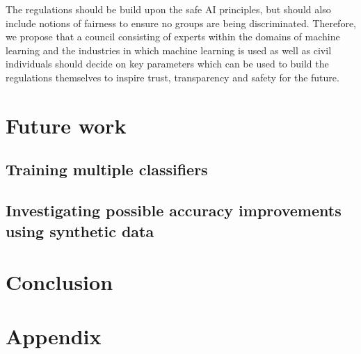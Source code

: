 \documentclass[12pt, fleqn, titlepage]{article}
\newcommand{\1}[1]{\mathds{1}\left[#1\right]}
\begin{document}
The regulations should be build upon the safe AI principles, but should also include notions of fairness to ensure no groups are being discriminated. Therefore, we propose that a council consisting of experts within the domains of machine learning and the industries in which machine learning is used as well as civil individuals should decide on key parameters which can be used to build the regulations themselves to inspire trust, transparency and safety for the future. 

\section{Future work}


\subsection{Training multiple classifiers}

\subsection{Investigating possible accuracy improvements using synthetic data}


\section{Conclusion}\label{conclusion}



\newpage
\section{Appendix}\label{appendix}
\end{document}

